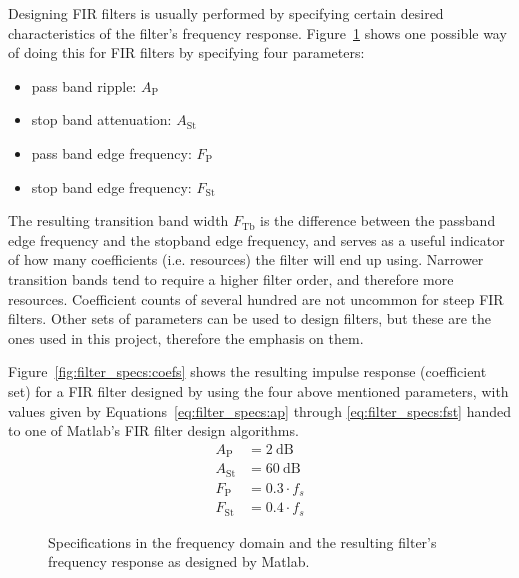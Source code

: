 Designing    FIR    filters    is     usually    performed    by    specifying
certain     desired    characteristics     of    the     filter's    frequency
response. Figure~\ref{fig:filter_specs:freqResponse} shows one possible way of
doing this for FIR filters by specifying four parameters:
\begin{itemize}\tightlist
    \item
        pass band ripple: $A_\mathrm{P}$
    \item
        stop band attenuation: $A_\mathrm{St}$
    \item
        pass band edge frequency: $F_\mathrm{P}$
    \item
        stop band edge frequency: $F_\mathrm{St}$
\end{itemize}
The resulting transition band width  $F_\mathrm{Tb}$ is the difference between
the passband edge  frequency and the stopband edge frequency,  and serves as a
useful indicator of how many coefficients (i.e. resources) the filter will end
up using. Narrower transition bands tend to require a higher filter order, and
therefore  more  resources. Coefficient  counts  of several  hundred  are  not
uncommon  for steep  FIR filters.   Other sets  of parameters  can be  used to
design filters,  but these are  the ones used  in this project,  therefore the
emphasis on them.

Figure~\ref{fig:filter_specs:coefs}  shows  the   resulting  impulse  response
(coefficient  set)  for  a  FIR  filter  designed  by  using  the  four  above
mentioned parameters, with  values given by Equations~\ref{eq:filter_specs:ap}
through \ref{eq:filter_specs:fst} handed to one  of Matlab's FIR filter design
algorithms.
\begin{align}
    A_\mathrm{P}  &= \SI{2}{\dB}   \label{eq:filter_specs:ap}\\
    A_\mathrm{St} &= \SI{60}{\dB}  \label{eq:filter_specs:ast}\\
    F_\mathrm{P}  &= 0.3 \cdot f_s \label{eq:filter_specs:fp}\\
    F_\mathrm{St} &= 0.4 \cdot f_s \label{eq:filter_specs:fst}
\end{align}

\begin{figure}
    \centering
    
    \caption[Specifying FIR Filter Constraints]{
        Specifications in the frequency domain and the resulting filter's
        frequency response as designed by Matlab.%
    }
    \label{fig:filter_specs:freqResponse}
\end{figure}

